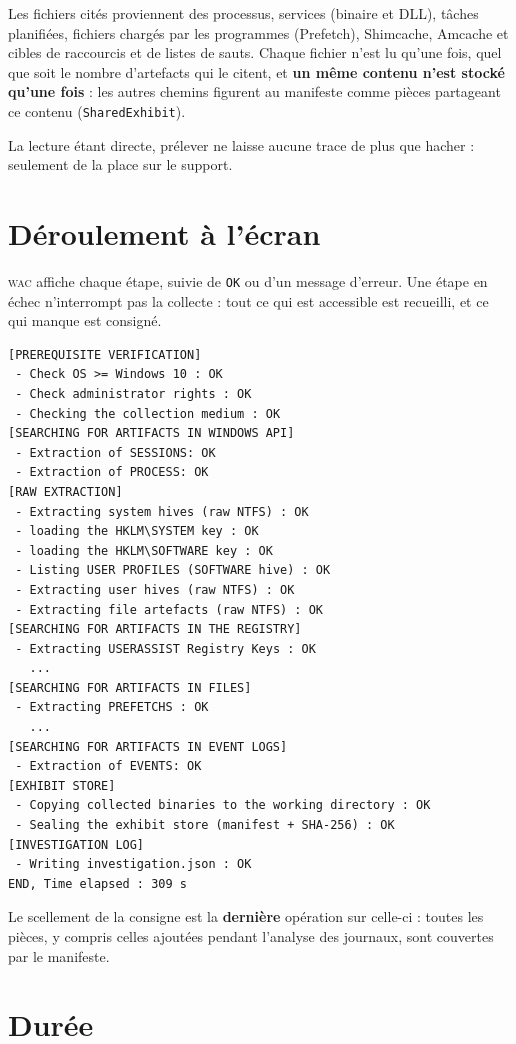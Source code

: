\documentclass[11pt,a4paper,oneside]{report}
\newcommand{\wac}{\textsc{wac}}
\newcommand{\champ}[1]{\texttt{#1}}
\begin{document}
Les fichiers cités proviennent des processus, services (binaire et DLL), tâches
planifiées, fichiers chargés par les programmes (Prefetch), Shimcache, Amcache et
cibles de raccourcis et de listes de sauts. Chaque fichier n'est lu qu'une fois, quel que soit le
nombre d'artefacts qui le citent, et \textbf{un même contenu n'est stocké
qu'une fois} : les autres chemins figurent au manifeste comme pièces partageant
ce contenu (\champ{SharedExhibit}).

La lecture étant directe, prélever ne laisse aucune trace de plus que hacher :
seulement de la place sur le support.

\section{Déroulement à l'écran}

\wac{} affiche chaque étape, suivie de \texttt{OK} ou d'un message d'erreur. Une
étape en échec n'interrompt pas la collecte : tout ce qui est accessible est
recueilli, et ce qui manque est consigné.

\begin{lstlisting}
[PREREQUISITE VERIFICATION]
 - Check OS >= Windows 10 : OK
 - Check administrator rights : OK
 - Checking the collection medium : OK
[SEARCHING FOR ARTIFACTS IN WINDOWS API]
 - Extraction of SESSIONS: OK
 - Extraction of PROCESS: OK
[RAW EXTRACTION]
 - Extracting system hives (raw NTFS) : OK
 - loading the HKLM\SYSTEM key : OK
 - loading the HKLM\SOFTWARE key : OK
 - Listing USER PROFILES (SOFTWARE hive) : OK
 - Extracting user hives (raw NTFS) : OK
 - Extracting file artefacts (raw NTFS) : OK
[SEARCHING FOR ARTIFACTS IN THE REGISTRY]
 - Extracting USERASSIST Registry Keys : OK
   ...
[SEARCHING FOR ARTIFACTS IN FILES]
 - Extracting PREFETCHS : OK
   ...
[SEARCHING FOR ARTIFACTS IN EVENT LOGS]
 - Extraction of EVENTS: OK
[EXHIBIT STORE]
 - Copying collected binaries to the working directory : OK
 - Sealing the exhibit store (manifest + SHA-256) : OK
[INVESTIGATION LOG]
 - Writing investigation.json : OK
END, Time elapsed : 309 s
\end{lstlisting}

Le scellement de la consigne est la \textbf{dernière} opération sur celle-ci :
toutes les pièces, y compris celles ajoutées pendant l'analyse des journaux, sont
couvertes par le manifeste.

\section{Durée}
\end{document}
